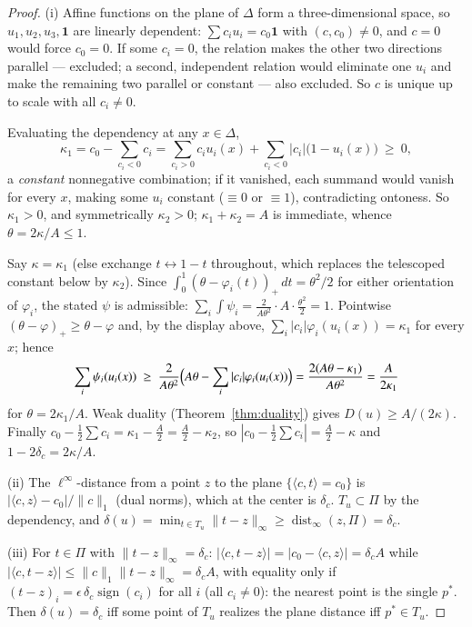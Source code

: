\documentclass{aims}
\numberwithin{equation}{section}
\theoremstyle{plain}
\theoremstyle{definition}
\theoremstyle{remark}
\begin{document}
\begin{proof}
(i) Affine functions on the plane of $\Delta$ form a three-dimensional space,
so $u_1,u_2,u_3,\mathbf1$ are linearly dependent:
$\sum c_iu_i=c_0\mathbf1$ with $(c,c_0)\ne0$, and $c=0$ would force $c_0=0$.
If some $c_i=0$, the relation makes the other two directions parallel ---
excluded; a second, independent relation would eliminate one $u_i$ and make
the remaining two parallel or constant --- also excluded. So $c$ is unique up
to scale with all $c_i\ne0$.

Evaluating the dependency at any $x\in\Delta$,
\[
\kappa_1=c_0-\sum_{c_i<0}c_i
=\sum_{c_i>0}c_iu_i(x)+\sum_{c_i<0}|c_i|\bigl(1-u_i(x)\bigr)\ \ge\ 0,
\]
a \emph{constant} nonnegative combination; if it vanished, each summand would
vanish for every $x$, making some $u_i$ constant ($\equiv0$ or $\equiv1$),
contradicting ontoness. So $\kappa_1>0$, and symmetrically $\kappa_2>0$;
$\kappa_1+\kappa_2=A$ is immediate, whence $\theta=2\kappa/A\le1$.

Say $\kappa=\kappa_1$ (else exchange $t\leftrightarrow1-t$ throughout, which
replaces the telescoped constant below by $\kappa_2$). Since
$\int_0^1(\theta-\varphi_i(t))_+\,dt=\theta^2/2$ for either orientation of
$\varphi_i$, the stated $\psi$ is admissible:
$\sum_i\int\psi_i=\frac{2}{A\theta^2}\cdot A\cdot\frac{\theta^2}2=1$. Pointwise
$(\theta-\varphi)_+\ge\theta-\varphi$ and, by the display above,
$\sum_i|c_i|\varphi_i(u_i(x))=\kappa_1$ for every $x$; hence
\[
\sum_i\psi_i(u_i(x))\ \ge\ \frac{2}{A\theta^2}\Bigl(A\theta-
\sum_i|c_i|\varphi_i(u_i(x))\Bigr)=\frac{2(A\theta-\kappa_1)}{A\theta^2}
=\frac{A}{2\kappa_1}
\]
for $\theta=2\kappa_1/A$. Weak duality (Theorem~\ref{thm:duality}) gives
$D(u)\ge A/(2\kappa)$. Finally $c_0-\tfrac12\sum c_i=\kappa_1-\tfrac A2
=\tfrac A2-\kappa_2$, so $|c_0-\tfrac12\sum c_i|=\tfrac A2-\kappa$ and
$1-2\delta_c=2\kappa/A$.

(ii) The $\ell^\infty$-distance from a point $z$ to the plane
$\{\langle c,t\rangle=c_0\}$ is $|\langle c,z\rangle-c_0|/\|c\|_1$ (dual
norms), which at the center is $\delta_c$. $T_u\subset\Pi$ by the dependency,
and $\delta(u)=\min_{t\in T_u}\|t-z\|_\infty\ge\operatorname{dist}_\infty
(z,\Pi)=\delta_c$.

(iii) For $t\in\Pi$ with $\|t-z\|_\infty=\delta_c$:
$|\langle c,t-z\rangle|=|c_0-\langle c,z\rangle|=\delta_cA$ while
$|\langle c,t-z\rangle|\le\|c\|_1\|t-z\|_\infty=\delta_cA$, with equality only
if $(t-z)_i=\epsilon\,\delta_c\operatorname{sign}(c_i)$ for all $i$ (all
$c_i\ne0$): the nearest point is the single $p^\ast$. Then
$\delta(u)=\delta_c$ iff some point of $T_u$ realizes the plane distance iff
$p^\ast\in T_u$.
\end{proof}
\end{document}
